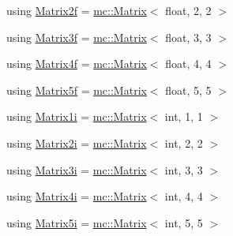 \begin{DoxyCompactItemize}
\item 
using \hyperlink{namespacemc_a7f5fd82341ebac4add0554139e58ec61}{Matrix2f} = \hyperlink{structmc_1_1_matrix}{mc\+::\+Matrix}$<$ float, 2, 2 $>$
\item 
using \hyperlink{namespacemc_a142a9fb1b5ed3503c520caca5924389e}{Matrix3f} = \hyperlink{structmc_1_1_matrix}{mc\+::\+Matrix}$<$ float, 3, 3 $>$
\item 
using \hyperlink{namespacemc_afd32b9ea49ccd962bb337dc71450595b}{Matrix4f} = \hyperlink{structmc_1_1_matrix}{mc\+::\+Matrix}$<$ float, 4, 4 $>$
\item 
using \hyperlink{namespacemc_ab12faae3cb1ef53b80a57c8586134343}{Matrix5f} = \hyperlink{structmc_1_1_matrix}{mc\+::\+Matrix}$<$ float, 5, 5 $>$
\item 
using \hyperlink{namespacemc_abd3b65ef804598d2bcb93051d7fbcc9e}{Matrix1i} = \hyperlink{structmc_1_1_matrix}{mc\+::\+Matrix}$<$ int, 1, 1 $>$
\item 
using \hyperlink{namespacemc_a3d6ef8ef71b722b552a14b3859cca75f}{Matrix2i} = \hyperlink{structmc_1_1_matrix}{mc\+::\+Matrix}$<$ int, 2, 2 $>$
\item 
using \hyperlink{namespacemc_af5dbdaac2f76c49ea96bafaf8743298e}{Matrix3i} = \hyperlink{structmc_1_1_matrix}{mc\+::\+Matrix}$<$ int, 3, 3 $>$
\item 
using \hyperlink{namespacemc_a2b5b12e5123fac956ab87c789991537e}{Matrix4i} = \hyperlink{structmc_1_1_matrix}{mc\+::\+Matrix}$<$ int, 4, 4 $>$
\item 
using \hyperlink{namespacemc_ae1c885363bd63ce278b21e95350ca637}{Matrix5i} = \hyperlink{structmc_1_1_matrix}{mc\+::\+Matrix}$<$ int, 5, 5 $>$
\end{DoxyCompactItemize}

